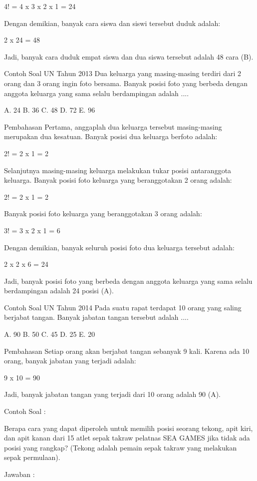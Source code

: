 \documentclass[11pt,fleqn]{book} %
\begin{document}
4! = 4 x 3 x 2 x 1 = 24

Dengan demikian, banyak cara siswa dan siswi tersebut duduk adalah:

2 x 24 = 48

Jadi, banyak cara duduk empat siswa dan dua siswa tersebut adalah 48 cara (B).

Contoh Soal UN Tahun 2013
Dua keluarga yang masing-masing terdiri dari 2 orang dan 3 orang ingin foto bersama. Banyak posisi foto yang berbeda dengan anggota keluarga yang sama selalu berdampingan adalah ....

A.   24
B.   36
C.   48
D.   72
E.   96


Pembahasan
Pertama, anggaplah dua keluarga tersebut masing-masing merupakan dua kesatuan. Banyak posisi dua keluarga berfoto adalah:

2! = 2 x 1 = 2

Selanjutnya masing-masing keluarga melakukan tukar posisi antaranggota keluarga. Banyak posisi foto keluarga yang beranggotakan 2 orang adalah:

2! = 2 x 1 = 2

Banyak posisi foto keluarga yang beranggotakan 3 orang adalah:

3! = 3 x 2 x 1 = 6

Dengan demikian, banyak seluruh posisi foto dua keluarga tersebut adalah:

2 x 2 x 6 = 24

Jadi, banyak posisi foto yang berbeda dengan anggota keluarga yang sama selalu berdampingan adalah 24 posisi (A). 

Contoh Soal UN Tahun 2014 
Pada suatu rapat terdapat 10 orang yang saling berjabat tangan. Banyak jabatan tangan tersebut adalah ....

A.   90
B.   50
C.   45
D.   25
E.   20


Pembahasan
Setiap orang akan berjabat tangan sebanyak 9 kali. Karena ada 10 orang, banyak jabatan yang terjadi adalah:

9 x 10 = 90

Jadi, banyak jabatan tangan yang terjadi dari 10 orang  adalah 90 (A).


Contoh Soal :

Berapa cara yang dapat diperoleh untuk memilih posisi seorang tekong, apit kiri, dan apit kanan dari 15 atlet sepak takraw pelatnas SEA GAMES jika tidak ada posisi yang rangkap? (Tekong adalah pemain sepak takraw yang melakukan sepak permulaan).

Jawaban :
\end{document}
